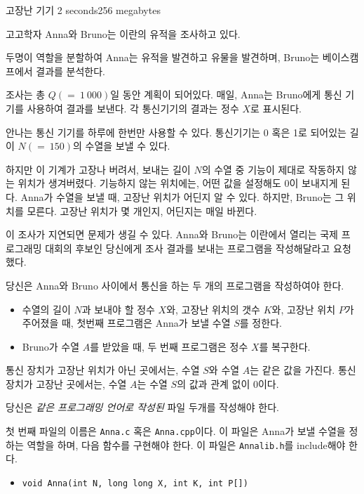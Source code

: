 \begin{problem}{고장난 기기}
	{}{}
	{2 seconds}{256 megabytes}{}
	
	고고학자 Anna와 Bruno는 이란의 유적을 조사하고 있다.

	두명이 역할을 분할하여 Anna는 유적을 발견하고 유물을 발견하며, Bruno는 베이스캠프에서 결과를 분석한다.
	
	조사는 총 $Q(=\ 1\ 000)$일 동안 계획이 되어있다. 매일, Anna는 Bruno에게 통신 기기를 사용하여 결과를 보낸다. 각 통신기기의 결과는 정수 $X$로 표시된다.
	
	안나는 통신 기기를 하루에 한번만 사용할 수 있다. 통신기기는 0 혹은 1로 되어있는 길이 $N(=\ 150)$의 수열을 보낼 수 있다.
	
	하지만 이 기계가 고장나 버려서, 보내는 길이 $N$의 수열 중 기능이 제대로 작동하지 않는 위치가 생겨버렸다. 기능하지 않는 위치에는, 어떤 값을 설정해도 0이 보내지게 된다. Anna가 수열을 보낼 때, 고장난 위치가 어딘지 알 수 있다. 하지만, Bruno는 그 위치를 모른다. 고장난 위치가 몇 개인지, 어딘지는 매일 바뀐다.
	
	이 조사가 지연되면 문제가 생길 수 있다. Anna와 Bruno는 이란에서 열리는 국제 프로그래밍 대회의 후보인 당신에게 조사 결과를 보내는 프로그램을 작성해달라고 요청했다.

	당신은 Anna와 Bruno 사이에서 통신을 하는 두 개의 프로그램을 작성하여야 한다.
	
	\begin{itemize}
		\item 수열의 길이 $N$과 보내야 할 정수 $X$와, 고장난 위치의 갯수 $K$와, 고장난 위치 $P$가 주어졌을 때, 첫번째 프로그램은 Anna가 보낼 수열 $S$를 정한다.
		\item Bruno가 수열 $A$를 받았을 때, 두 번째 프로그램은 정수 $X$를 복구한다.
	\end{itemize}

	통신 장치가 고장난 위치가 아닌 곳에서는, 수열 $S$와 수열 $A$는 같은 값을 가진다. 통신 장치가 고장난 곳에서는, 수열 $A$는 수열 $S$의 값과 관계 없이 0이다.


	\Specification
	
	당신은 \textit{같은 프로그래밍 언어로 작성된} 파일 두개를 작성해야 한다.
	
	첫 번째 파일의 이름은 \texttt{Anna.c} 혹은 \texttt{Anna.cpp}이다. 이 파일은 Anna가 보낼 수열을 정하는 역할을 하며, 다음 함수를 구현해야 한다. 이 파일은 \texttt{Annalib.h}를 include해야 한다.
	
	\begin{itemize}
		\item \texttt{void Anna(int N, long long X, int K, int P[])}
		

\end{itemize}
\end{problem}
